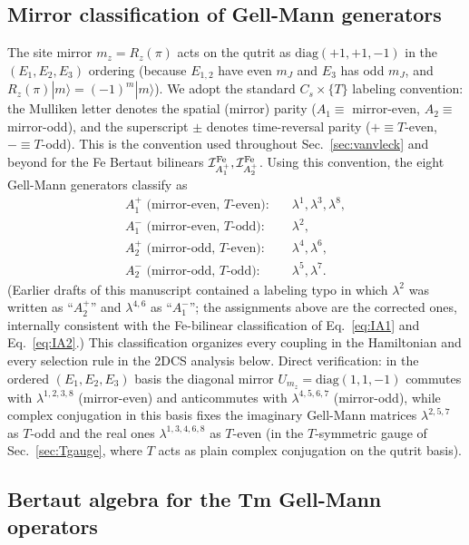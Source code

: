 \documentclass[reprint,amsmath,amssymb,aps,prb,longbibliography]{revtex4-2}
\newcommand{\fix}[1]{#1}
\begin{document}
\subsection{Mirror classification of Gell-Mann generators}
The site mirror $m_z = R_z(\pi)$ acts on the qutrit as
$\mathrm{diag}(+1,+1,-1)$ in the $(E_1,E_2,E_3)$ ordering (because $E_{1,2}$
have even $m_J$ and $E_3$ has odd $m_J$, and $R_z(\pi)|m\rangle=(-1)^m|m\rangle$).
\fix{We adopt the standard $C_s\times\{T\}$ labeling convention:
the Mulliken letter denotes the spatial (mirror) parity
($A_1\equiv$ mirror-even, $A_2\equiv$ mirror-odd), and the superscript
$\pm$ denotes time-reversal parity ($+\equiv T$-even, $-\equiv T$-odd).
This is the convention used throughout Sec.~\ref{sec:vanvleck} and
beyond for the Fe Bertaut bilinears
$\mathcal I^{\rm Fe}_{A_1^+},\mathcal I^{\rm Fe}_{A_2^+}$.}
Using this convention, the eight Gell-Mann generators classify as
\begin{equation}
\boxed{
\begin{aligned}
A_1^+ \text{ (mirror-even, $T$-even):} &\quad \lambda^1,\lambda^3,\lambda^8,\\
A_1^- \text{ (mirror-even, $T$-odd):} &\quad \lambda^2,\\
A_2^+ \text{ (mirror-odd, $T$-even):} &\quad \lambda^4,\lambda^6,\\
A_2^- \text{ (mirror-odd, $T$-odd):} &\quad \lambda^5,\lambda^7.
\end{aligned}}
\label{eq:lambdaclass}
\end{equation}
\fix{(Earlier drafts of this manuscript contained a labeling typo in
which $\lambda^2$ was written as ``$A_2^+$'' and $\lambda^{4,6}$ as
``$A_1^-$''; the assignments above are the corrected ones, internally
consistent with the Fe-bilinear classification of Eq.~\eqref{eq:IA1}
and Eq.~\eqref{eq:IA2}.)}
This classification organizes every coupling in the Hamiltonian and
every selection rule in the 2DCS analysis below. Direct verification:
in the ordered $(E_1,E_2,E_3)$ basis the diagonal mirror $U_{m_z}=
\mathrm{diag}(1,1,-1)$ commutes with $\lambda^{1,2,3,8}$ (mirror-even)
and anticommutes with $\lambda^{4,5,6,7}$ (mirror-odd), while complex
conjugation in this basis fixes the imaginary Gell-Mann matrices
$\lambda^{2,5,7}$ as $T$-odd and the real ones
$\lambda^{1,3,4,6,8}$ as $T$-even (in the $T$-symmetric gauge of
Sec.~\ref{sec:Tgauge}, where $T$ acts as plain complex conjugation
on the qutrit basis).

\subsection{Bertaut algebra for the Tm Gell-Mann operators}
\label{sec:LambdaBertaut}
\end{document}
